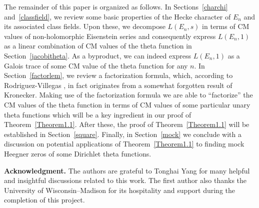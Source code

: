 \documentclass[11pt, reqno]{amsart}
\theoremstyle{plain}
\newtheorem{conjecture}[theorem]{Conjecture}
\theoremstyle{definition}
\numberwithin{equation}{section}
\begin{document}
The remainder of this paper is organized as follows. In Sections~\ref{charchi} and~\ref{classfield}, we review  some basic properties of the Hecke character of $E_{n}$ and its associated class fields. Upon these, we decompose $L(E_{n},s)$ in terms of CM values of non-holomorphic Eisenstein series and consequently  express $L(E_{n},1)$ as a linear combination of CM values of the  theta function in Section~\ref{jacobitheta}. As a byproduct, we can indeed express $L(E_{n},1)$ as a Galois trace of some CM value of the  theta function for any $n$. In Section~\ref{factorlem}, we review a factorization formula, which, according to Rodriguez-Villegas \cite{V1}, in fact originates from a somewhat forgotten result of Kronecker.
 Making use of the factorization formula we are able to ``factorize'' the CM values of the theta function in terms of CM values of some particular unary theta functions which will be a key ingredient in our proof of Theorem~\ref{Theorem1.1}. After these, the proof of Theorem~\ref{Theorem1.1} will be established in Section~\ref{square}. Finally, in Section~\ref{mock} we conclude  with a discussion on potential applications of Theorem~\ref{Theorem1.1} to finding mock Heegner zeros of some Dirichlet theta functions.

{\bf Acknowledgment.} The authors are grateful to Tonghai Yang for many helpful and insightful discussions related to this work. The first author also thanks the University of Wisconsin–Madison for its hospitality and support during the completion of this project.
 


\end{document}
